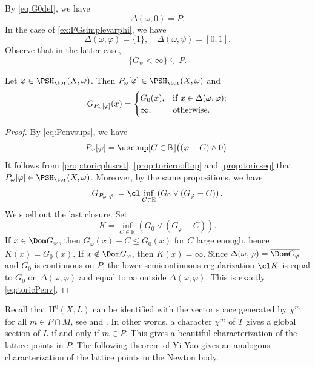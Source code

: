 \begin{example}\label{ex:toric-ample:L621}
    By \eqref{eq:G0def}, we have
    \[
    \Delta(\omega,0)=P.
    \]
    In the case of \cref{ex:FGsimplevarphi}, we have
    \[
    \Delta(\omega,\varphi)=\{1\},\quad \Delta(\omega,\psi)=[0,1].
    \]
    Observe that in the latter case,
    \[
    \{G_{\psi}<\infty\}\subsetneq P.
    \]
\end{example}


\begin{proposition}\label{prop:GPenvelope}
    Let $\varphi\in \PSH_{\tor}(X,\omega)$. Then $P_{\omega}[\varphi]\in \PSH_{\tor}(X,\omega)$ and
    \begin{equation}\label{eq:toricPenv}
    G_{P_{\omega}[\varphi]}(x)=
    \begin{cases}
        G_0(x),&\textup{if } x\in \Delta(\omega,\varphi);\\
        \infty,&\textup{otherwise}.
    \end{cases}
    \end{equation}
\end{proposition}
\begin{proof}
    By \eqref{eq:Penvsups}, we have
    \[
    P_{\omega}[\varphi]=\uscsup[C\in \mathbb{R}]\bigl((\varphi+C)\land 0\bigr).
    \]
    It follows from \cref{prop:toricpluscst}, \cref{prop:toricrooftop} and \cref{prop:toricseq} that $P_{\omega}[\varphi]\in \PSH_{\tor}(X,\omega)$. Moreover, by the same propositions, we have
    \[
    G_{P_{\omega}[\varphi]}=\cl \inf_{C\in \mathbb{R}} \left( G_{0}\lor (G_{\varphi}-C) \right).
    \]
    We spell out the last closure. Set
    \[
        K=\inf_{C\in \mathbb{R}} \left( G_{0}\lor (G_{\varphi}-C) \right).
    \]
    If $x\in \Dom G_{\varphi}$, then $G_{\varphi}(x)-C\leq G_0(x)$ for $C$ large enough, hence $K(x)=G_0(x)$. If $x\notin \Dom G_{\varphi}$, then $K(x)=\infty$. Since $\Delta(\omega,\varphi)=\overline{\Dom G_{\varphi}}$ and $G_0$ is continuous on $P$, the lower semicontinuous regularization $\cl K$ is equal to $G_0$ on $\Delta(\omega,\varphi)$ and equal to $\infty$ outside $\Delta(\omega,\varphi)$. This is exactly \eqref{eq:toricPenv}.

\end{proof}

Recall that $\mathrm{H}^0(X,L)$ can be identified with the vector space generated by $\chi^m$ for all $m\in P\cap M$, see \cite[Proposition~4.3.3]{CLS11} and \cite[Theorem~18.8.5]{FPT}. In other words, a character $\chi^m$ of $T$ gives a global section of $L$ if and only if $m\in P$. This gives a beautiful characterization of the lattice points in $P$. The following theorem of Yi Yao gives an analogous characterization of the lattice points in the Newton body.

